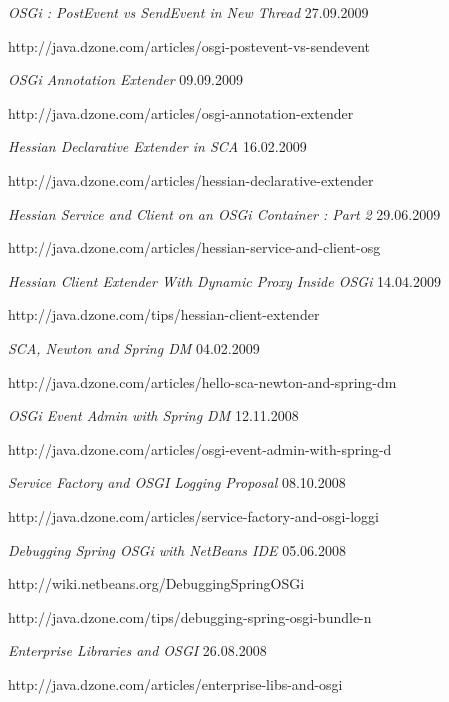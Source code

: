 \documentclass{res}
\begin{document}
\begin{resume}
{\sl OSGi : PostEvent vs SendEvent in New Thread}  \hfill   27.09.2009	\\
\item[] http://java.dzone.com/articles/osgi-postevent-vs-sendevent

{\sl OSGi Annotation Extender}  \hfill    09.09.2009	\\
\item[] http://java.dzone.com/articles/osgi-annotation-extender

{\sl Hessian Declarative Extender in SCA}  \hfill   16.02.2009\\
\item[] http://java.dzone.com/articles/hessian-declarative-extender

{\sl Hessian Service and Client on an OSGi Container : Part 2}  \hfill   29.06.2009	\\
\item[] http://java.dzone.com/articles/hessian-service-and-client-osg

{\sl Hessian Client Extender With Dynamic Proxy Inside OSGi}  \hfill   14.04.2009	\\
\item[] http://java.dzone.com/tips/hessian-client-extender

{\sl SCA, Newton and Spring DM}  \hfill    04.02.2009	\\
\item[] http://java.dzone.com/articles/hello-sca-newton-and-spring-dm

{\sl OSGi Event Admin with Spring DM}  \hfill   12.11.2008 \\
\item[] http://java.dzone.com/articles/osgi-event-admin-with-spring-d

{\sl Service Factory and OSGI Logging Proposal}  \hfill   08.10.2008	\\
\item[] http://java.dzone.com/articles/service-factory-and-osgi-loggi

{\sl Debugging Spring OSGi with NetBeans IDE}  \hfill   05.06.2008	\\
\item[] http://wiki.netbeans.org/DebuggingSpringOSGi

\item[] http://java.dzone.com/tips/debugging-spring-osgi-bundle-n

{\sl Enterprise Libraries and OSGI}  \hfill   26.08.2008	\\
\item[] http://java.dzone.com/articles/enterprise-libs-and-osgi


\end{resume}
\end{document}
